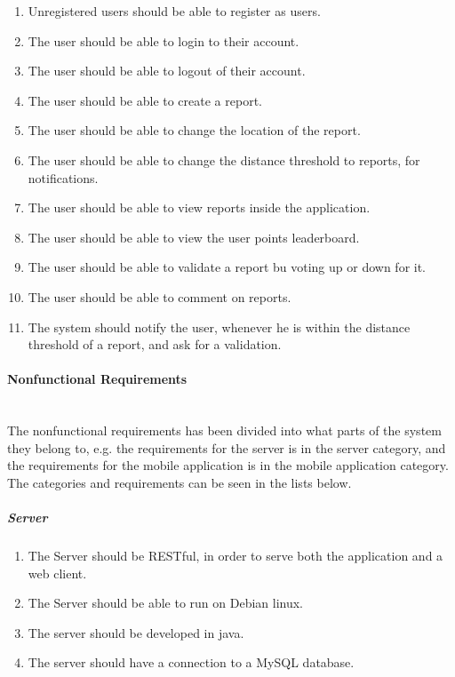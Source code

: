 \begin{enumerate}[label=F\arabic*]
\item Unregistered users should be able to register as users.
\item The user should be able to login to their account.
\item The user should be able to logout of their account.
\item The user should be able to create a report.
\item The user should be able to change the location of the report.
\item The user should be able to change the distance threshold to reports, for notifications.
\item The user should be able to view reports inside the application.
\item The user should be able to view the user points leaderboard.
\item The user should be able to validate a report bu voting up or down for it.
\item The user should be able to comment on reports.
\item The system should notify the user, whenever he is within the distance threshold of a report, and ask for a validation.
\end{enumerate}

\paragraph{Nonfunctional Requirements}~\\
The nonfunctional requirements has been divided into what parts of the system they belong to, e.g. the requirements for the server is in the server category, and the requirements for the mobile application is in the mobile application category.
The categories and requirements can be seen in the lists below.

\subparagraph{Server}
\begin{enumerate}[label=NS\arabic*]
\item The Server should be RESTful, in order to serve both the application and a web client.
\item The Server should be able to run on Debian linux.
\item The server should be developed in java.
\item The server should have a connection to a MySQL database.
\end{enumerate}

